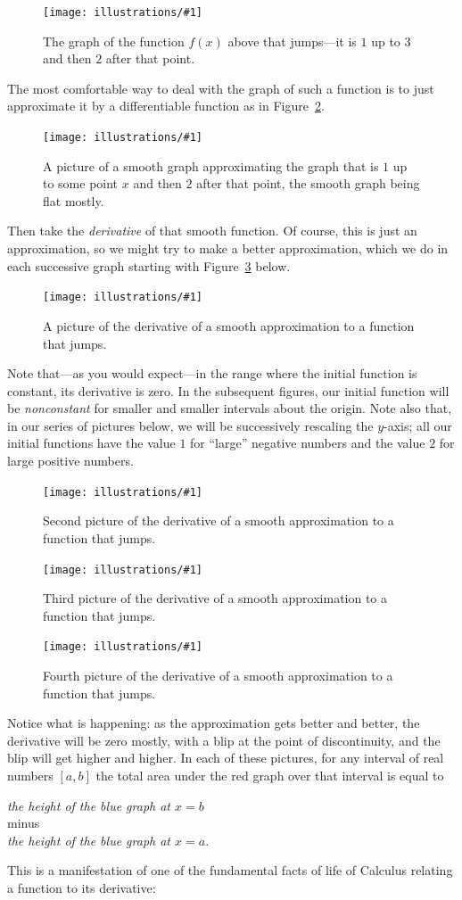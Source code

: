\documentclass[openany]{book}
\newcommand{\ill}[3]{%
   \begin{figure}[H]%
   \vspace{-2ex}
   \centering%
   \texttt{[image: illustrations/\#1]}%
   \caption{#3}%
   \vspace{-2ex}
    \end{figure}}
\theoremstyle{plain}
\theoremstyle{definition}
\begin{document}
{\ill{jump}{0.5}{The graph of the function $f(x)$ above that jumps---it is $1$ up to $3$ and then $2$ after that point.\label{fig:jump}}


The most comfortable way to deal with the graph of such a function is
to just approximate it by a differentiable function as in
Figure~\ref{fig:jumpsmooth}. %


\ill{jump-smooth}{0.5}{A picture of a smooth graph approximating the
  graph that is $1$ up to some point $x$ and then $2$ after that
  point, the smooth graph being flat mostly.\label{fig:jumpsmooth}}


Then take the {\em derivative} of that smooth function.  Of course,
this is just an approximation, so we might try to make a better
approximation, which we do in each successive graph starting
with Figure~\ref{fig:djump1} below.


\ill{jump-smooth-deriv-7}{0.6}{A picture of the derivative of
a smooth approximation to a function that jumps.\label{fig:djump1}}

Note that---as you would expect---in the range where the initial
function is constant, its derivative is zero. In the subsequent
figures, our initial function will be {\it nonconstant} for smaller
and smaller intervals about the origin. Note also that, in our series
of pictures below, we will be successively rescaling the $y$-axis; all
our initial functions have the value $1$ for ``large'' negative numbers
and the value $2$ for large positive numbers.

\ill{jump-smooth-deriv-2}{0.5}{Second picture of the derivative of
a smooth approximation to a function that jumps.\label{fig:djump2}}
\ill{jump-smooth-deriv-05}{0.5}{Third picture of the derivative of
a smooth approximation to a function that jumps.\label{fig:djump3}}
\ill{jump-smooth-deriv-01}{0.5}{Fourth picture of the derivative of
a smooth approximation to a function that jumps.\label{fig:djump4}}


Notice what is happening: as the approximation gets better and
better, the derivative will be zero mostly, with a blip at the point
of discontinuity, and the blip will get higher and higher.
In each of these pictures,  for any interval of real numbers $[a,b]$ the total area under the red graph over that interval is equal to
\begin{center}
{\it the height of the blue graph at $x=b$}\\
minus\\
{\it  the height of the blue graph  at $x=a$}.
\end{center}
This is a manifestation of one of the fundamental facts of life of
Calculus relating a function to its derivative:

}
\end{document}
